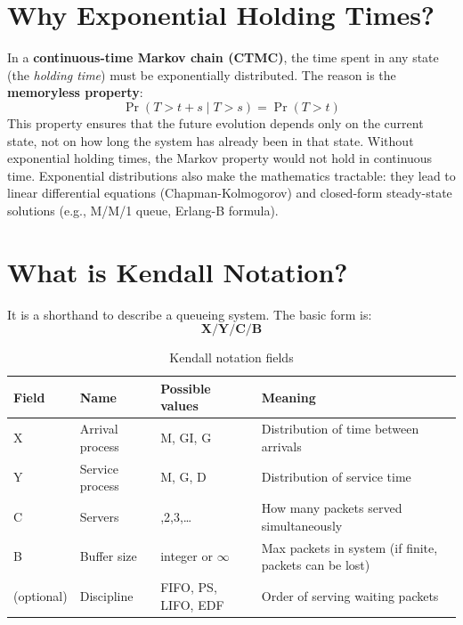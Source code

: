 \section{Why Exponential Holding Times?}
In a \textbf{continuous-time Markov chain (CTMC)}, the time spent in any state (the \textit{holding time}) must be exponentially distributed. 
The reason is the \textbf{memoryless property}:
\[
\Pr(T > t + s \mid T > s) = \Pr(T > t)
\]
This property ensures that the future evolution depends only on the current state, not on how long the system has already been in that state. 
Without exponential holding times, the Markov property would not hold in continuous time. 
Exponential distributions also make the mathematics tractable: they lead to linear differential equations (Chapman-Kolmogorov) and closed-form steady-state solutions (e.g., M/M/1 queue, Erlang-B formula).

\section{What is Kendall Notation?}

It is a shorthand to describe a queueing system.
The basic form is: 
\[
\mathbf{X / Y / C / B}
\]

\begin{table}[h!]
\centering
\caption{Kendall notation fields}
\begin{tabular}{>{\raggedright\arraybackslash}p{2.5cm} 
                >{\raggedright\arraybackslash}p{2.5cm} 
                >{\raggedright\arraybackslash}p{3.5cm} 
                >{\raggedright\arraybackslash}p{6cm}}
\toprule
\textbf{Field} & \textbf{Name} & \textbf{Possible values} & \textbf{Meaning} \\
\midrule
X & Arrival process & M, GI, G & Distribution of time between arrivals \\
\hline
Y & Service process & M, G, D & Distribution of service time \\
\hline
C & Servers & 1,2,3,\dots & How many packets served simultaneously \\
\hline
B & Buffer size & integer or \(\infty\) & Max packets in system (if finite, packets can be lost) \\
\hline
(optional) & Discipline & FIFO, PS, LIFO, EDF & Order of serving waiting packets \\
\bottomrule
\end{tabular}
\end{table}


